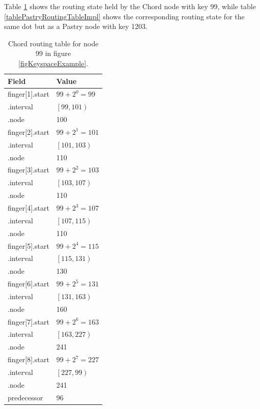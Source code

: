 Table \ref{tableChordRoutingTableImpl} shows the routing state held by the Chord node with key 99, while table \ref{tablePastryRoutingTableImpl} shows the corresponding routing state for the same dot but as a Pastry node with key 1203.

\begin{table}[!htb]
\caption{Chord routing table for node 99 in figure \ref{figKeyspaceExample}.}
\begin{center}
\begin{tabular}{ | l | l | }
  \hline                       
  Field & Value \\
  \hline  
  \hline  
  finger[1].start & $ 99 + 2^{0} = 99 $ \\
  \hline  
  \;.interval & $ \left[ 99, 101 \right) $ \\
  \hline  
  \;.node & 100 \\
  \hline  
  finger[2].start & $ 99 + 2^{1} = 101 $ \\
  \hline  
  \;.interval & $ \left[ 101, 103 \right) $ \\
  \hline  
  \;.node & 110 \\
  \hline  
  finger[3].start & $ 99 + 2^{2} = 103 $ \\
  \hline  
  \;.interval & $ \left[ 103, 107 \right) $ \\
  \hline  
  \;.node & 110 \\
  \hline  
  finger[4].start & $ 99 + 2^{3} = 107 $ \\
  \hline  
  \;.interval & $ \left[ 107, 115 \right) $ \\
  \hline  
  \;.node & 110 \\
  \hline  
  finger[5].start & $ 99 + 2^{4} = 115 $ \\
  \hline  
  \;.interval & $ \left[ 115, 131 \right) $ \\
  \hline  
  \;.node & 130 \\
  \hline  
  finger[6].start & $ 99 + 2^{5} = 131 $ \\
  \hline  
  \;.interval & $ \left[ 131, 163 \right) $ \\
  \hline  
  \;.node & 160 \\
  \hline  
  finger[7].start & $ 99 + 2^{6} = 163 $ \\
  \hline  
  \;.interval & $ \left[ 163, 227 \right) $ \\
  \hline  
  \;.node & 241 \\
  \hline  
  finger[8].start & $ 99 + 2^{7} = 227 $ \\
  \hline  
  \;.interval & $ \left[ 227, 99 \right) $ \\
  \hline
  \;.node & 241 \\
  \hline  
  predecessor & 96 \\
  \hline  
\end{tabular}
\end{center}
\label{tableChordRoutingTableImpl}
\end{table}

